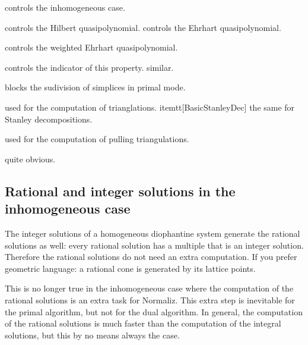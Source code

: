 \begin{itemize}
	\itemtt[IsInhomogeneous] controls the inhomogeneous case.
	
	\itemtt[HilbertQuasiPolynomial] controls the Hilbert quasipolynomial.
	\itemtt[EhrhartQuasiPolynomial] controls the Ehrhart quasipolynomial.
	
	\itemtt[WeightedEhrhartQuasiPolynomial] controls the weighted Ehrhart quasipolynomial.
	
	\itemtt[IsTriangulationNested] controls the indicator of this property.
	\itemtt[IsTriangulationPartial] similar.
	
	\itemtt[NoSubdivision] blocks the sudivision of simplices in primal mode.
	
	\itemtt[BasicTriangulation] used for the computation of trianglations.
	itemtt[BasicStanleyDec] the same for Stanley decompositions.
	
	
	\itemtt[PullingTriangulationInternal] used for the computation of pulling triangulations.
		
	\itemtt[SingleLatticePointInternal]  quite obvious.
	
\end{itemize}

\subsection{Rational and integer solutions in the inhomogeneous case}\label{InhomDual}

The integer solutions of a homogeneous diophantine system generate the rational solutions as well: every rational solution has a multiple that is an integer solution. Therefore the rational solutions do not need an extra computation. If you prefer geometric language: a rational cone is generated by its lattice points.

This is no longer true in the inhomogeneous case where the computation of the rational solutions is an extra task for Normaliz. This extra step is inevitable for the primal algorithm, but not for the dual algorithm. In general, the computation of the rational solutions is much faster than the computation of the integral solutions, but this by no means always the case.

